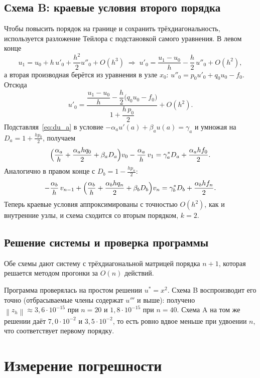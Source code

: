 \documentclass[12pt,a4paper]{article}
\newcommand{\norm}[1]{\left\|#1\right\|}
\begin{document}
\subsection{Схема B: краевые условия второго порядка}
\label{sec:scheme2}

Чтобы повысить порядок на границе и сохранить трёхдиагональность,
используется разложение Тейлора с подстановкой самого уравнения. В левом
конце
\[
u_1=u_0+h\,u'_0+\frac{h^2}{2}u''_0+O(h^3)
\;\Longrightarrow\;
u'_0=\frac{u_1-u_0}{h}-\frac{h}{2}\,u''_0+O(h^2),
\]
а вторая производная берётся из уравнения в узле $x_0$:
$u''_0=p_0u'_0+q_0u_0-f_0$. Отсюда
\begin{equation}\label{eq:du_a}
u'_0=\frac{\dfrac{u_1-u_0}{h}-\dfrac{h}{2}\bigl(q_0u_0-f_0\bigr)}
          {1+\dfrac{h\,p_0}{2}}+O(h^2).
\end{equation}
Подставляя~\eqref{eq:du_a} в условие $-\alpha_a u'(a)+\beta_a u(a)=\gamma_a$
и умножая на $D_a=1+\tfrac{h p_0}{2}$, получаем
\begin{equation}\label{eq:bc2a}
\Bigl(\frac{\alpha_a}{h}+\frac{\alpha_a h q_0}{2}+\beta_a D_a\Bigr)v_0
-\frac{\alpha_a}{h}\,v_1
=\gamma^*_a D_a+\frac{\alpha_a h f_0}{2}.
\end{equation}
Аналогично в правом конце с $D_b=1-\tfrac{h p_n}{2}$:
\begin{equation}\label{eq:bc2b}
-\frac{\alpha_b}{h}\,v_{n-1}
+\Bigl(\frac{\alpha_b}{h}+\frac{\alpha_b h q_n}{2}+\beta_b D_b\Bigr)v_n
=\gamma^*_b D_b+\frac{\alpha_b h f_n}{2}.
\end{equation}
Теперь краевые условия аппроксимированы с точностью $O(h^2)$, как и
внутренние узлы, и схема сходится со вторым порядком, $k=2$.

\subsection{Решение системы и проверка программы}

Обе схемы дают систему с трёхдиагональной матрицей порядка $n+1$, которая
решается методом прогонки за $O(n)$ действий.

Программа проверялась на простом решении $u^*=x^2$. Схема B воспроизводит
его точно (отбрасываемые члены содержат $u'''$ и выше): получено
$\norm{z_h}\approx 3{,}6\cdot10^{-15}$ при $n=20$ и
$1{,}8\cdot10^{-15}$ при $n=40$. Схема A на том же решении даёт
$7{,}0\cdot10^{-2}$ и $3{,}5\cdot10^{-2}$, то есть ровно вдвое меньше при
удвоении $n$, что соответствует первому порядку.

\section{Измерение погрешности}
\end{document}
